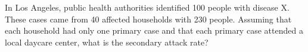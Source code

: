 In Los Angeles, public health authorities identified 100 people with disease X.  These cases came from 40 affected households with 230 people.  Assuming that each household had only one primary case and that each primary case attended a local daycare center, what is the secondary attack rate?
\begin{MultipleChoice}[itemname=II-10]
\end{MultipleChoice}

